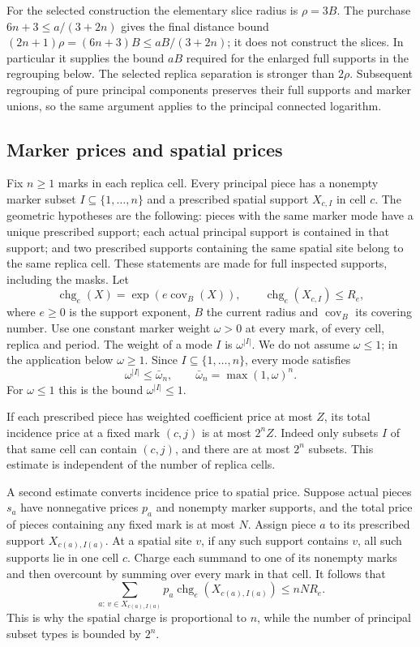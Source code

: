 For the selected construction the elementary slice radius is $\rho=3B$.
The purchase $6n+3\le a/(3+2n)$ gives the final distance bound
$(2n+1)\rho=(6n+3)B\le aB/(3+2n)$; it does not construct
the slices. In particular it supplies the bound $aB$ required for
the enlarged full supports in the regrouping below. The selected
replica separation is stronger than $2\rho$. Subsequent regrouping of pure principal
components preserves their full supports and marker unions, so the
same argument applies to the principal connected logarithm.

\subsection{Marker prices and spatial prices}

Fix $n\ge1$ marks in each replica cell. Every principal piece has a
nonempty marker subset $I\subseteq\{1,\ldots,n\}$ and a prescribed
spatial support $X_{c,I}$ in cell $c$. The geometric hypotheses are the
following: pieces with the same marker mode have a unique prescribed
support; each actual principal support is contained in that support;
and two prescribed supports containing the same spatial site belong
to the same replica cell. These statements are made for full inspected
supports, including the masks. Let
\[
 \operatorname{chg}_e(X)=\exp(e\operatorname{cov}_B(X)),\qquad
 \operatorname{chg}_e(X_{c,I})\le R_e,
\]
where $e\ge0$ is the support exponent, $B$ the current radius and
$\operatorname{cov}_B$ its covering number. Use one constant marker
weight $\omega>0$ at every mark, of every cell, replica and period.
The weight of a mode $I$ is $\omega^{|I|}$. We do not assume
$\omega\le1$; in the application below $\omega\ge1$. Since
$I\subseteq\{1,\ldots,n\}$, every mode satisfies
\begin{equation}\label{eq:allarity-mode-weight}
 \omega^{|I|}\le\bar\omega_n,\qquad
 \bar\omega_n=\max(1,\omega)^n .
\end{equation}
For $\omega\le1$ this is the bound $\omega^{|I|}\le1$.

If each prescribed piece has weighted coefficient price at most $Z$,
its total incidence price at a fixed mark $(c,j)$ is at most $2^nZ$.
Indeed only subsets $I$ of that same cell can contain $(c,j)$, and
there are at most $2^n$ subsets. This estimate is independent of the
number of replica cells.

A second estimate converts incidence price to spatial price. Suppose
actual pieces $s_a$ have nonnegative prices $p_a$ and nonempty marker
supports, and the total price of pieces containing any fixed mark is
at most $N$. Assign piece $a$ to its prescribed support
$X_{c(a),I(a)}$. At a spatial site $v$, if any such support contains
$v$, all such supports lie in one cell $c$. Charge each summand to
one of its nonempty marks and then overcount by summing over every
mark in that cell. It follows that
\begin{equation}\label{eq:allarity-spatial-incidence}
 \sum_{a:\,v\in X_{c(a),I(a)}}
            p_a\operatorname{chg}_e(X_{c(a),I(a)})
                    \le n N R_e.
\end{equation}
This is why the spatial charge is proportional to $n$, while the
number of principal subset types is bounded by $2^n$.

